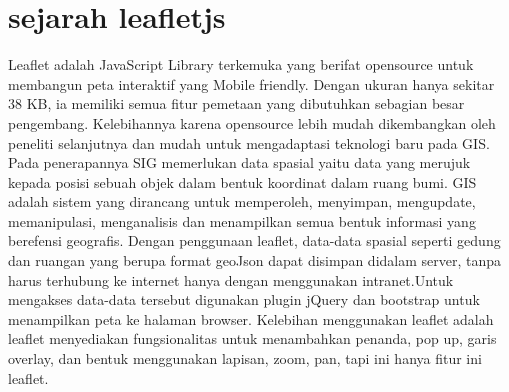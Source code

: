  
 
 
 \section{sejarah leafletjs}
        Leaflet adalah JavaScript Library terkemuka yang berifat opensource untuk membangun peta interaktif yang Mobile friendly. Dengan ukuran hanya sekitar 38 KB, ia memiliki semua fitur pemetaan yang dibutuhkan sebagian besar pengembang.
    Kelebihannya karena opensource lebih mudah dikembangkan oleh peneliti selanjutnya dan mudah untuk mengadaptasi teknologi baru pada GIS. Pada penerapannya SIG memerlukan data spasial yaitu data yang merujuk kepada posisi sebuah objek dalam bentuk koordinat dalam ruang bumi. GIS adalah sistem yang dirancang untuk memperoleh, menyimpan, mengupdate, memanipulasi, menganalisis dan menampilkan semua bentuk informasi yang berefensi geografis.
Dengan penggunaan leaflet, data-data spasial seperti gedung dan ruangan yang berupa format geoJson dapat disimpan didalam server, tanpa harus terhubung ke internet hanya dengan menggunakan intranet.Untuk mengakses data-data tersebut digunakan plugin jQuery dan bootstrap untuk menampilkan peta ke halaman browser. Kelebihan menggunakan leaflet adalah leaflet menyediakan fungsionalitas untuk menambahkan penanda, pop up, garis overlay, dan bentuk menggunakan lapisan, zoom, pan, tapi ini hanya fitur ini leaflet.

